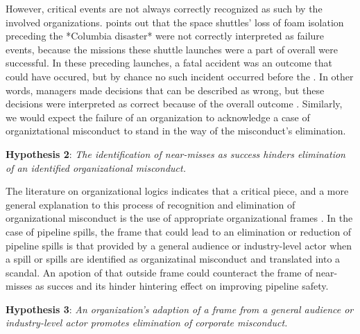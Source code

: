 However, critical events are not always correctly recognized as such by the involved organizations. \citep{Madsen2010} points out that the space shuttles' loss of foam isolation preceding the *Columbia disaster* were not correctly interpreted as failure events, because the missions these shuttle launches were a part of overall were successful. In these preceding launches, a fatal accident was an outcome that could have occured, but by chance no such incident occurred before the \citep{Madsen2010}. In other words, managers made decisions that can be described as wrong, but these decisions were interpreted as correct because of the overall outcome \citep{Dillon2008}. Similarly, we would expect the failure of an organization to acknowledge a case of organiztational misconduct to stand in the way of the misconduct's elimination.

\textbf{Hypothesis 2}: \textit{The identification of near-misses as success hinders elimination of an identified organizational misconduct.}

The literature on organizational logics indicates that a critical piece, and a more general explanation to this process of recognition and elimination of organizational misconduct is the use of appropriate organizational frames \citep{Misangyi2008}. In the case of pipeline spills, the frame that could lead to an elimination or reduction of pipeline spills is that provided by a general audience or industry-level actor when a spill or spills are identified as organizatinal misconduct and translated into a scandal. An apotion of that outside frame could counteract the frame of near-misses as succes and its hinder hintering effect on improving pipeline safety.

\textbf{Hypothesis 3}: \textit{An organization's adaption of a frame from a general audience or industry-level actor promotes elimination of corporate misconduct.}